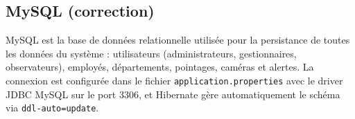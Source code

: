 \subsection{MySQL (correction)}

MySQL est la base de données relationnelle utilisée pour la persistance de toutes
les données du système : utilisateurs (administrateurs, gestionnaires, observateurs),
employés, départements, pointages, caméras et alertes. La connexion est configurée
dans le fichier \texttt{application.properties} avec le driver JDBC MySQL sur le
port 3306, et Hibernate gère automatiquement le schéma via \texttt{ddl-auto=update}.


%


%

